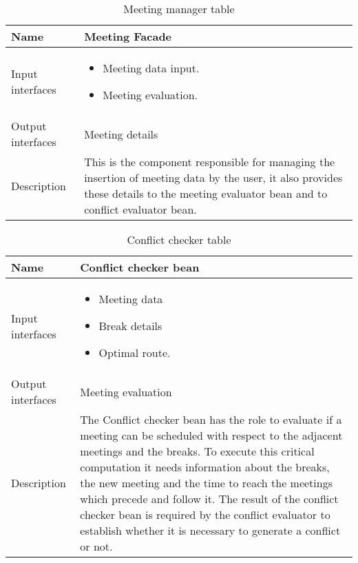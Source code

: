 \begin{flushleft}

\begin{table}[htp]

\begin{tabular}{l|p{7cm}}

Name&\textbf{Meeting Facade}\\
\hline
\hline
Input interfaces&
	\begin{itemize}
	\item Meeting data input.
	\item Meeting evaluation.
	\end{itemize}
\\
\hline
Output interfaces& Meeting details 
\\
\hline
Description&This is the component responsible for managing the insertion of meeting data by the user, it also provides these details to the meeting evaluator bean and to conflict evaluator bean.
\\
\hline


\end{tabular}

\caption{Meeting manager  table } 
\label{tab:meetingmanagertable}

\end{table}

\end{flushleft}

\begin{flushleft}
	
	\begin{table}[htp]
		
		\begin{tabular}{l|p{7cm}}
		
			Name&\textbf{Conflict checker bean}\\
			\hline
			\hline
			Input interfaces&
			\begin{itemize}
				\item Meeting data  \item Break details \item Optimal route.
			\end{itemize}
			\\
			\hline
			Output interfaces& Meeting evaluation\\
			\hline
			Description&The Conflict checker bean has the role to evaluate if a meeting can be scheduled with respect to the adjacent meetings and the breaks. To execute this critical computation it needs information about the breaks, the new meeting and the time to reach the meetings which precede and follow it. The result of the conflict checker bean is required by the conflict evaluator to establish whether it is necessary to generate a conflict or not. \\
			\hline
			
			
		\end{tabular}
		
		\caption{Conflict checker  table } 
		\label{tab:conflictcheckertable}
		
	\end{table}
	
\end{flushleft}

